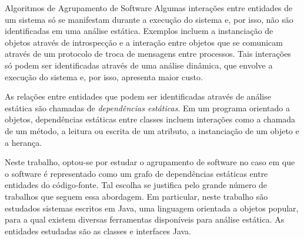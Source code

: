 \begin{section}{Algoritmos de Agrupamento de Software}
Algumas interações entre entidades de um sistema só se manifestam durante a execução do sistema e, por isso, não são identificadas em uma análise estática. Exemplos incluem a instanciação de objetos através de introspecção e a interação entre objetos que se comunicam através de um protocolo de troca de mensagens entre processos. Tais interações só podem ser identificadas através de uma análise dinâmica, que envolve a execução do sistema e, por isso, apresenta maior custo.

As relações entre entidades que podem ser identificadas através de análise estática são chamadas de \emph{dependências estáticas}. Em um programa orientado a objetos, dependências estáticas entre classes incluem interações como a chamada de um método, a leitura ou escrita de um atributo, a instanciação de um objeto e a herança.

Neste trabalho, optou-se por estudar o agrupamento de software no caso em que o software é representado como um grafo de dependências estáticas entre entidades do código-fonte. Tal escolha se justifica pelo grande número de trabalhos que seguem essa abordagem. Em particular, neste trabalho são estudados sistemas escritos em Java, uma linguagem orientada a objetos popular, para a qual existem diversas ferramentas disponíveis para análise estática. As entidades estudadas são as classes e interfaces Java.

% 


% 



\end{section}

